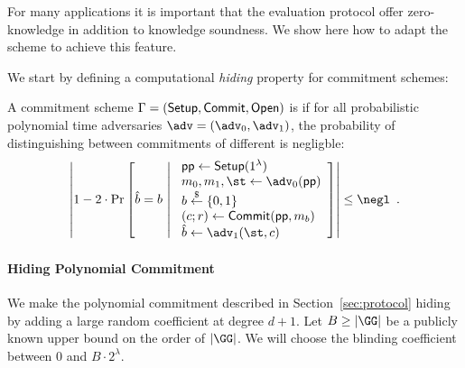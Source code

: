 For many applications it is important that the evaluation protocol offer zero-knowledge in addition to knowledge soundness. We show here how to adapt the scheme to achieve this feature.

We start by defining a computational \emph{hiding} property for commitment schemes:

\begin{definition}
A commitment scheme $\Gamma = (\textsf{{Setup}}, \textsf{{Commit}}, \textsf{{Open}})$ is  if for all probabilistic polynomial time adversaries $\adv = (\adv_0, \adv_1)$, the probability of distinguishing between commitments of different is negligble:
\[
	\left| 1 - 2 \cdot \mathrm{Pr}\left[
		\hat{b} = b \ \middle| \ 
		\begin{array}{l}
			\params \gets \pro{Setup}(1^\lambda) \\
			m_0, m_1, \st \gets \adv_0(\params) \\
			b \sample \{0,1\} \\
			(c; r) \gets \pro{Commit}(\params, m_b) \\
			\hat{b} \gets \adv_1(\st, c)
		\end{array}
	\right] \right| \leq \negl \enspace .
\]
\end{definition}

\paragraph{Hiding Polynomial Commitment}
We make the polynomial commitment described in Section~\ref{sec:protocol} hiding by adding a large random coefficient at degree $d+1$. Let $B\geq |\GG|$ be a publicly known upper bound on the order of $|\GG|$. We will choose the blinding coefficient between $0$ and $B\cdot 2^\lambda$. 

